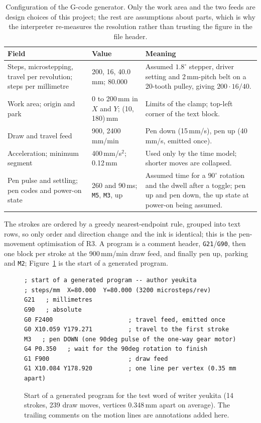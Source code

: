 \begin{table}[!htbp]
\centering
\fontsize{8}{9.6}\selectfont
\setlength{\tabcolsep}{4pt}
\begin{tabularx}{\linewidth}{|p{3.4cm}|p{2.4cm}|X|}
\hline
\textbf{Field} & \textbf{Value} & \textbf{Meaning} \\
\hline
Steps, microstepping, travel per revolution; steps per millimetre & 200, 16, 40.0\,mm; 80.000 & Assumed $1.8^\circ$ stepper, driver setting and 2\,mm-pitch belt on a 20-tooth pulley, giving $200\cdot16/40$. \\
Work area; origin and park & 0 to 200\,mm in $X$ and $Y$; (10, 180)\,mm & Limits of the clamp; top-left corner of the text block. \\
Draw and travel feed & 900, 2400\,mm/min & Pen down (15\,mm/s), pen up (40\,mm/s, emitted once). \\
Acceleration; minimum segment & 400\,mm/s$^2$; 0.12\,mm & Used only by the time model; shorter moves are collapsed. \\
Pen pulse and settling; pen codes and power-on state & 260 and 90\,ms; \texttt{M5}, \texttt{M3}, up & Assumed time for a $90^\circ$ rotation and the dwell after a toggle; pen up and pen down, the up state at power-on being assumed. \\
\hline
\end{tabularx}
\caption{Configuration of the G-code generator. Only the work area and the two feeds are design choices of this project; the rest are assumptions about parts, which is why the interpreter re-measures the resolution rather than trusting the figure in the file header.}
\label{tab:gc-config}
\end{table}

The strokes are ordered by a greedy nearest-endpoint rule, grouped into text rows, so only order and direction change and the ink is identical; this is the pen-movement optimisation of R3. A program is a comment header, \texttt{G21}/\texttt{G90}, then one block per stroke at the 900\,mm/min draw feed, and finally pen up, parking and \texttt{M2}; Figure~\ref{fig:gc-emit} is the start of a generated program.

\begin{figure}[!htbp]
\centering
\fontsize{8}{9.2}\selectfont
\begin{lstlisting}[basicstyle=\ttfamily\fontsize{8}{9.2}\selectfont,frame=none]
; start of a generated program -- author yeukita
; steps/mm  X=80.000  Y=80.000 (3200 microsteps/rev)
G21   ; millimetres
G90   ; absolute
G0 F2400                     ; travel feed, emitted once
G0 X10.059 Y179.271          ; travel to the first stroke
M3   ; pen DOWN (one 90deg pulse of the one-way gear motor)
G4 P0.350   ; wait for the 90deg rotation to finish
G1 F900                      ; draw feed
G1 X10.084 Y178.920          ; one line per vertex (0.35 mm apart)
\end{lstlisting}
\caption{Start of a generated program for the test word of writer yeukita (14 strokes, 239 draw moves, vertices 0.348\,mm apart on average). The trailing comments on the motion lines are annotations added here.}
\label{fig:gc-emit}
\end{figure}

